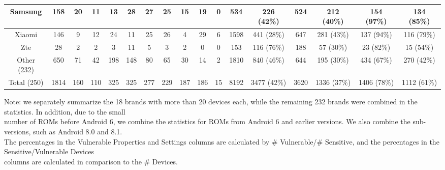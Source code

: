 \begin{table*}[th]
\begin{threeparttable}
{\begin{tabular}{|c|c|ccccccccc|cc|cc|cc|}
Samsung                & 158                           & \multicolumn{1}{c|}{20}     & \multicolumn{1}{c|}{11}  & \multicolumn{1}{c|}{13}  & \multicolumn{1}{c|}{28}  & \multicolumn{1}{c|}{27}  & \multicolumn{1}{c|}{25}  & \multicolumn{1}{c|}{15}  & \multicolumn{1}{c|}{19}  & 0   & 534          & 226 (42\%)         & 524          & 212 (40\%)         & 154 (97\%)        & 134 (85\%)         \\ \hline
Xiaomi                 & 146                           & \multicolumn{1}{c|}{9}      & \multicolumn{1}{c|}{12}  & \multicolumn{1}{c|}{24}  & \multicolumn{1}{c|}{11}  & \multicolumn{1}{c|}{25}  & \multicolumn{1}{c|}{26}  & \multicolumn{1}{c|}{4}   & \multicolumn{1}{c|}{29}  & 6   & 1598         & 441 (28\%)         & 647          & 281 (43\%)         & 137 (94\%)        & 116 (79\%)         \\ \hline
Zte                    & 28                            & \multicolumn{1}{c|}{2}      & \multicolumn{1}{c|}{2}   & \multicolumn{1}{c|}{3}   & \multicolumn{1}{c|}{11}  & \multicolumn{1}{c|}{5}   & \multicolumn{1}{c|}{3}   & \multicolumn{1}{c|}{2}   & \multicolumn{1}{c|}{0}   & 0   & 153          & 116 (76\%)         & 188          & 57 (30\%)          & 23 (82\%)         & 15 (54\%)          \\ \hline
Other (232)            & 650                           & \multicolumn{1}{c|}{71}     & \multicolumn{1}{c|}{42}  & \multicolumn{1}{c|}{198} & \multicolumn{1}{c|}{148} & \multicolumn{1}{c|}{80}  & \multicolumn{1}{c|}{65}  & \multicolumn{1}{c|}{30}  & \multicolumn{1}{c|}{14}  & 2   & 1810         & 840 (46\%)         & 644          & 195 (30\%)         & 434 (67\%)        & 270 (42\%)         \\ \hline
Total (250)            & 1814                          & \multicolumn{1}{c|}{160}    & \multicolumn{1}{c|}{110} & \multicolumn{1}{c|}{325} & \multicolumn{1}{c|}{325} & \multicolumn{1}{c|}{277} & \multicolumn{1}{c|}{229} & \multicolumn{1}{c|}{187} & \multicolumn{1}{c|}{186} & 15  & 8192         & 3477 (42\%)        & 3620         & 1336 (37\%)        & 1406 (78\%)       & 1112 (61\%)        \\ \hline
\end{tabular}
}
\begin{tablenotes}
	\footnotesize
	\item Note: we separately summarize the 18 brands with more than 20 devices each, while the remaining 232 brands were combined in the statistics. In addition, due to the small \\number of ROMs before Android 6, we combine the statistics for ROMs from Android 6 and earlier versions. We also combine the sub-versions, such as Android 8.0 and 8.1. \\The percentages in the Vulnerable Properties and Settings columns are calculated by \# Vulnerable/\# Sensitive, and the percentages in the Sensitive/Vulnerable Devices \\columns are calculated in comparison to the \# Devices.
\end{tablenotes}
\end{threeparttable}
\end{table*}

